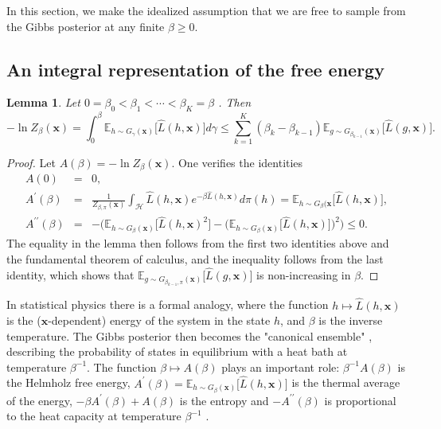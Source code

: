\documentclass{article} %
\newtheorem{lemma}[theorem]{Lemma}
\begin{document}
In this section, we make the idealized assumption that we are free to sample
from the Gibbs posterior at any finite $\beta \geq 0$.

\subsection{An integral representation of the free energy\label{Section integral representation}}

\begin{lemma}
\label{Lemma Derivatives}Let $0=\beta _{0}<\beta _{1}<\cdots<\beta _{K}=\beta $%
. Then%
\begin{equation*}
-\ln Z_{\beta }(\mathbf{x}) =\int_{0}^{\beta }\mathbb{E}_{h\sim
G_{\gamma }(\mathbf{x})}\big[ \hat{L}( h,\mathbf{x})\big] d\gamma \leq \sum_{k=1}^{K}(\beta_{k}-\beta_{k-1})\mathbb{E}_{g\sim G_{\beta _{k-1}}(\mathbf{x})}\big[ \hat{L}( g,\mathbf{x}) \big].
\end{equation*}
\end{lemma}
\begin{proof}
Let $A(\beta) =-\ln Z_{\beta}(\mathbf{x})$. One
verifies the identities
\begin{eqnarray*}
A(0) &=&0, \\
A^{\prime}(\beta) &=&\frac{1}{Z_{\beta,\pi}(\mathbf{x})}\int_{\mathcal{H}}\hat{L}(h,\mathbf{x})e^{-\beta\hat{L}(h,\mathbf{x}) }d\pi(h)=\mathbb{E}_{h\sim G_{\beta}(\mathbf{x}}\big[\hat{L}(h,\mathbf{x})
\big],\\
A^{\prime \prime}(\beta) &=&-\Big( \mathbb{E}_{h\sim G_{\beta
}(\mathbf{x})}\big[\hat{L}(h,\mathbf{x})^{2}
\big] -\big(\mathbb{E}_{h\sim G_{\beta}(\mathbf{x})}\big[\hat{L}(h,\mathbf{x}) \big] \big)^{2}\Big) \leq 0\text{.}
\end{eqnarray*}
The equality in the lemma then follows from the first two identities above and the fundamental theorem of calculus, and the inequality follows from the last identity, which shows that $\mathbb{E}_{g\sim G_{\beta _{k-1},\pi
}(\mathbf{x})}\big[\hat{L}( g,\mathbf{x})\big]$
is non-increasing in $\beta$.
\end{proof}
In statistical physics there is a formal analogy, where the function $h\mapsto \hat{L}(h,\mathbf{x})$ is the ($\mathbf{x}$-dependent) energy of the system in the state $h$, and $\beta$ is the inverse
temperature. The Gibbs posterior then becomes the "canonical ensemble" \citep{gibbs1902elementary},
describing the probability of states in equilibrium with a heat bath at temperature $\beta ^{-1}$. The function $\beta
\mapsto A(\beta)$ plays an important role: $\beta ^{-1}A(\beta) $ is the Helmholz free energy, $A^{\prime}(\beta)=\mathbb{E}_{h\sim G_{\beta}(\mathbf{x})}\big[\hat{L}(h,\mathbf{x})\big]$ is the thermal average of the energy, $-\beta A^{\prime }(\beta)+A(\beta) $ is the entropy and $-A^{\prime \prime}(\beta )$ is proportional to the heat capacity at temperature $\beta ^{-1}$ \citep[see e.g.][]{huang2008statistical}.
\end{document}
